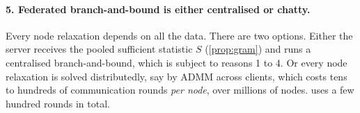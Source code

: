 \paragraph{5. Federated branch-and-bound is either centralised or chatty.}
Every node relaxation depends on all the data. There are two options. Either the server
receives the pooled sufficient statistic $S$ (\cref{prop:gram}) and runs a centralised
branch-and-bound, which is subject to reasons 1 to 4. Or every node relaxation is solved
distributedly, say by ADMM across clients, which costs tens to hundreds of communication
rounds \emph{per node}, over millions of nodes. \feddbn{} uses a few hundred rounds in
total.
